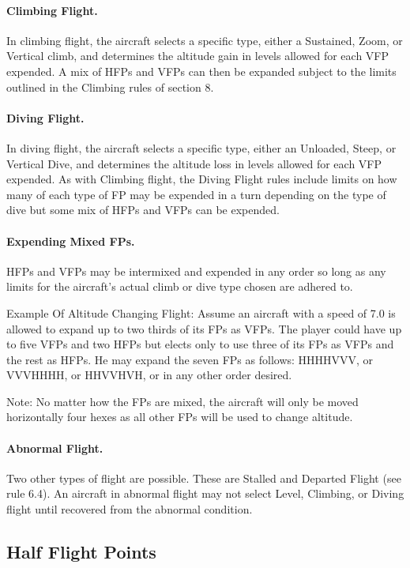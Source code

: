 \paragraph{Climbing Flight.} In climbing flight, the aircraft selects a specific type, either a Sustained, Zoom, or Vertical climb, and determines the altitude gain in levels allowed for each VFP expended. A mix of HFPs and VFPs can then be expanded subject to the limits outlined in the Climbing rules of section 8.

\paragraph{Diving Flight.} In diving flight, the aircraft selects a specific type, either an Unloaded, Steep, or Vertical Dive, and determines the altitude loss in levels allowed for each VFP expended. As with Climbing flight, the Diving Flight rules include limits on how many of each type of FP may be expended in a turn depending on the type of dive but some mix of HFPs and VFPs can be expended.

\paragraph{Expending Mixed FPs.} HFPs and VFPs may be intermixed and expended in any order so long as any limits for the aircraft's actual climb or dive type chosen are adhered to.

Example Of Altitude Changing Flight: Assume an aircraft with a speed of 7.0 is allowed to expand up to two thirds of its FPs as VFPs. The player could have up to five VFPs and two HFPs but elects only to use three of its FPs as VFPs and the rest as HFPs. He may expand the seven FPs as follows:
HHHHVVV, or VVVHHHH, or HHVVHVH, or in any other order desired.

Note: No matter how the FPs are mixed, the aircraft will only be moved horizontally four hexes as all other FPs will be used to change altitude.

\paragraph{Abnormal Flight.} Two other types of flight are possible. These are Stalled and Departed Flight (see rule 6.4).  An aircraft in abnormal flight may not select Level, Climbing, or Diving flight until recovered from the abnormal condition.

\advancedrules

\subsection{Half Flight Points}

